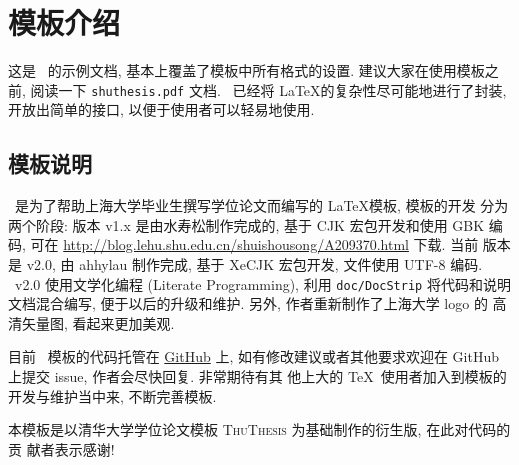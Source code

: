 \chapter{模板介绍}
\label{cha:intro}

这是 \shuthesis\ 的示例文档, 基本上覆盖了模板中所有格式的设置. 建议大家在使用模板之前, 阅读一下 \texttt{shuthesis.pdf} 文档. \shuthesis\ 已经将 \LaTeX 的复杂性尽可能地进行了封装, 开放出简单的接口, 以便于使用者可以轻易地使用.

\section{模板说明}
\shuthesis\ 是为了帮助上海大学毕业生撰写学位论文而编写的 \LaTeX 模板, 模板的开发
分为两个阶段: 版本 v1.x 是由水寿松制作完成的, 基于 CJK 宏包开发和使用 GBK 编码,
可在 \url{http://blog.lehu.shu.edu.cn/shuishousong/A209370.html} 下载. 当前
版本是 v2.0, 由 ahhylau 制作完成, 基于 XeCJK 宏包开发, 文件使用 UTF-8 编码.
\shuthesis\ v2.0 使用文学化编程 (Literate Programming), 利用 \texttt{doc/DocStrip}
将代码和说明文档混合编写, 便于以后的升级和维护. 另外, 作者重新制作了上海大学 logo 的
高清矢量图, 看起来更加美观.

目前 \shuthesis\ 模板的代码托管在 \href{https://github.com/ahhylau/shuthesis}{GitHub}
上, 如有修改建议或者其他要求欢迎在 GitHub 上提交 issue, 作者会尽快回复. 非常期待有其
他上大的 \TeX\ 使用者加入到模板的开发与维护当中来, 不断完善模板.

本模板是以清华大学学位论文模板 \textsc{ThuThesis} 为基础制作的衍生版, 在此对代码的贡
献者表示感谢!


